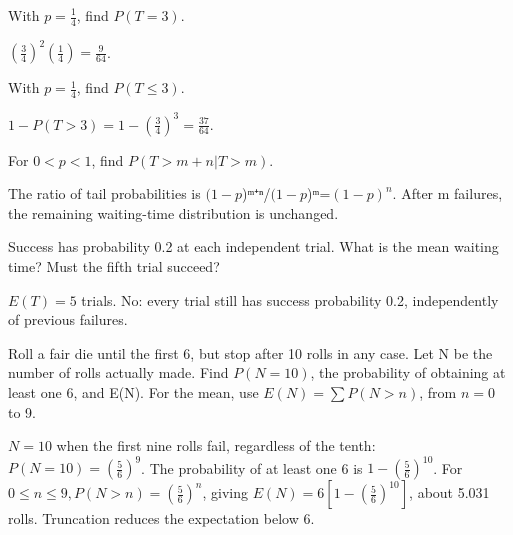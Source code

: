 \documentclass[11pt]{article}
\begin{document}
With \(p=\frac{1}{4}\), find \(P(T=3)\).\par
\((\frac{3}{4})^{2}(\frac{1}{4})=\frac{9}{64}\).\par
{}
With \(p=\frac{1}{4}\), find \(P(T\leq 3)\).\par
\(1-P(T>3)=1-(\frac{3}{4})^{3}=\frac{37}{64}\).\par
{}
For \(0<p<1\), find \(P(T>m+n|T>m)\).\par
The ratio of tail probabilities is \((1-p\))ᵐ⁺ⁿ/\((1-p\))ᵐ=\((1-p)^{n}\). After m failures, the remaining waiting-time distribution is unchanged.\par
{}
Success has probability 0.2 at each independent trial. What is the mean waiting time? Must the fifth trial succeed?\par
\(E(T)=5\) trials. No: every trial still has success probability 0.2, independently of previous failures.\par
{}
Roll a fair die until the first 6, but stop after 10 rolls in any case. Let N be the number of rolls actually made. Find \(P(N=10)\), the probability of obtaining at least one 6, and E(N). For the mean, use \(E(N)=\sum  P(N>n)\), from \(n=0\) to 9.\par
\(N=10\) when the first nine rolls fail, regardless of the tenth: \(P(N=10)=(\frac{5}{6})^{9}\). The probability of at least one 6 is \(1-(\frac{5}{6})^{10}\). For \(0\leq n\leq 9, P(N>n)=(\frac{5}{6})^{n}\), giving \(E(N)=6[1-(\frac{5}{6})^{10}]\), about 5.031 rolls. Truncation reduces the expectation below 6.\par
\end{document}
